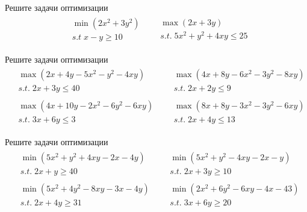 
\begin{exercise}
Решите задачи оптимизации
\begin{align*}
	&\begin{gathered}
		\min(2x^2+3y^2) \\  s.t\; x-y\geq 10
	\end{gathered} &
	&\begin{gathered}
		\max (2x+3y) \\ s.t.\; 5x^2+y^2+4xy\leq 25
	\end{gathered}
\end{align*}
\end{exercise}

\begin{exercise}
Решите задачи оптимизации
\begin{align*}
	&\begin{gathered}
		\max(2x+4y-5x^2-y^2-4xy)\\ s.t.\; 2x+3y\leq 40
	\end{gathered} &
	&\begin{gathered}
		\max(4x+8y-6x^2-3y^2-8xy)\\ s.t.\; 2x+2y\leq 9
	\end{gathered} \\
	&\begin{gathered}
		\max(4x+10y-2x^2-6y^2-6xy)\\ s.t.\; 3x+6y\leq 3
	\end{gathered} &
	&\begin{gathered}
		\max(8x+8y-3x^2-3y^2-6xy)\\ s.t.\; 2x+4y\leq 13
	\end{gathered}
\end{align*}
\end{exercise}

\begin{exercise}
Решите задачи оптимизации
\begin{align*}
	&\begin{gathered}
		\min(5x^2+y^2+4xy-2x-4y)\\ s.t.\; 2x+y\geq 40
	\end{gathered} &
	&\begin{gathered}
		\min(5x^2+y^2-4xy-2x-y)\\ s.t.\; 2x+3y\geq 10
	\end{gathered} \\
	&\begin{gathered}
		\min(5x^2+4y^2-8xy-3x-4y)\\ s.t.\; 2x+4y\geq 31
	\end{gathered} &
	&\begin{gathered}
		\min(2x^2+6y^2-6xy-4x-43)\\ s.t.\; 3x+6y\geq 20
	\end{gathered}
\end{align*}
\end{exercise}

